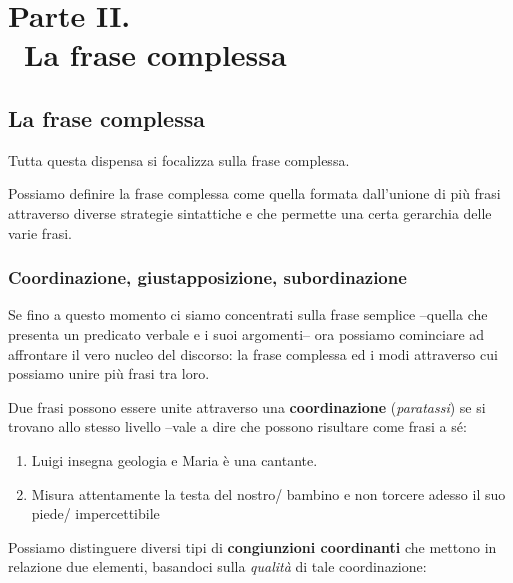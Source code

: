 \documentclass[
  a4paper,
  twoside,
  11pt,
  chapterprefix=false,
  bibliography=totocnumbered,
  listof=flat]{scrbook}
\begin{document}
\part*{Parte II. \\\ La frase complessa}

\hypertarget{la-frase-complessa}{%
\chapter{La frase complessa}\label{la-frase-complessa}}

Tutta questa dispensa si focalizza sulla frase complessa.

Possiamo definire la frase complessa come quella formata dall'unione di più frasi attraverso diverse strategie sintattiche e che permette una certa gerarchia delle varie frasi.

\hypertarget{coordinazione-giustapposizione-subordinazione}{%
\section{Coordinazione, giustapposizione, subordinazione}\label{coordinazione-giustapposizione-subordinazione}}

Se fino a questo momento ci siamo concentrati sulla frase semplice --quella che presenta un predicato verbale e i suoi argomenti-- ora possiamo cominciare ad affrontare il vero nucleo del discorso: la frase complessa ed i modi attraverso cui possiamo unire più frasi tra loro.

Due frasi possono essere unite attraverso una \textbf{coordinazione} (\emph{paratassi}) se si trovano allo stesso livello --vale a dire che possono risultare come frasi a sé:

\begin{enumerate}
\def\labelenumi{(\arabic{enumi})}
\setcounter{enumi}{17}
\item
  Luigi insegna geologia e Maria è una cantante.
\item
  Misura attentamente la testa del nostro/ bambino e non torcere adesso il suo piede/ impercettibile \citep[ \emph{Erotopaegnia 3}]{sanguineti1956}
\end{enumerate}

Possiamo distinguere diversi tipi di \textbf{congiunzioni coordinanti} che mettono in relazione due elementi, basandoci sulla \emph{qualità} di tale coordinazione:
\end{document}
